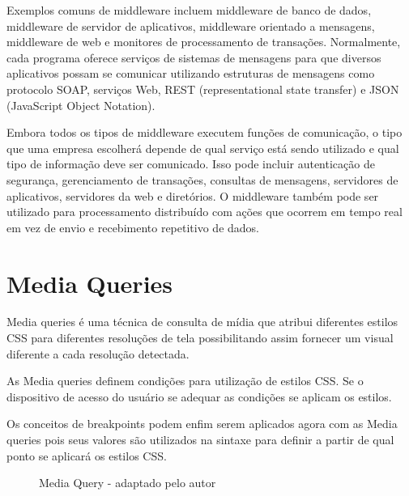 Exemplos comuns de middleware incluem middleware de banco de dados, middleware de servidor de aplicativos, middleware orientado a mensagens, middleware de web e monitores de processamento de transações. Normalmente, cada programa oferece serviços de sistemas de mensagens para que diversos aplicativos possam se comunicar utilizando estruturas de mensagens como protocolo SOAP, serviços Web, REST (representational state transfer) e JSON (JavaScript Object Notation). 

Embora todos os tipos de middleware executem funções de comunicação, o tipo que uma empresa escolherá depende de qual serviço está sendo utilizado e qual tipo de informação deve ser comunicado. Isso pode incluir autenticação de segurança, gerenciamento de transações, consultas de mensagens, servidores de aplicativos, servidores da web e diretórios. O middleware também pode ser utilizado para processamento distribuído com ações que ocorrem em tempo real em vez de envio e recebimento repetitivo de dados.

\section{Media Queries}
\label{sec:mediaqueries}

Media queries é uma técnica de consulta de mídia que atribui diferentes estilos CSS para diferentes resoluções de tela possibilitando assim fornecer um visual diferente a cada resolução detectada.

As Media queries definem condições para utilização de estilos CSS. Se o dispositivo de acesso do usuário se adequar as condições se aplicam os estilos.

Os conceitos de breakpoints podem enfim serem aplicados agora com as Media queries pois seus valores são utilizados na sintaxe para definir a partir de qual ponto se aplicará os estilos CSS. \cite{responsivo}

\begin{figure}[!htb]
    \centering
    \begin{minipage}{\wd0}
        \caption{Media Query - adaptado pelo autor}
    \end{minipage}
\end{figure}

